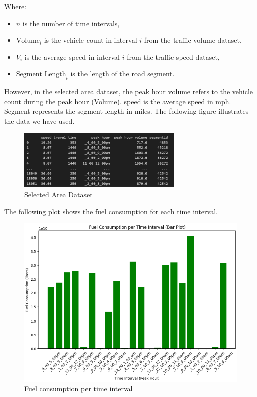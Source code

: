 Where:
\begin{itemize}
    \item \( n \) is the number of time intervals,
    \item \( \text{Volume}_i \) is the vehicle count in interval \( i \) from the traffic volume dataset,
    \item \( V_i \) is the average speed in interval \( i \) from the traffic speed dataset,
    \item \( \text{Segment Length}_i \) is the length of the road segment.
\end{itemize}
However, in the selected area dataset, the peak hour volume refers to the vehicle count during the peak hour (Volume).
\newline
\newline speed is the average speed in mph.
\newline Segment represents the segment length in miles.
\newline
\newline
The following figure illustrates the data we have used.
\newline
\begin{figure}[h]
    \centering
    \includegraphics[width=0.7\textwidth]{figures/data_used_to_calculate_Total_Fuel_Consumption_For_each_road_segment.PNG}
    \caption{Selected Area Dataset}
    \label{fig:Selected Area Dataset}
\end{figure}
\newline
The following plot shows the fuel consumption for each time interval.
\newline
\begin{figure}[H]
    \centering
    \includegraphics[width=1\linewidth]{figures/Fuel_consumption_per_time_interval.PNG}
    \caption{Fuel consumption per time interval}
    \label{fig:new_york_peak_hours}
\end{figure}
